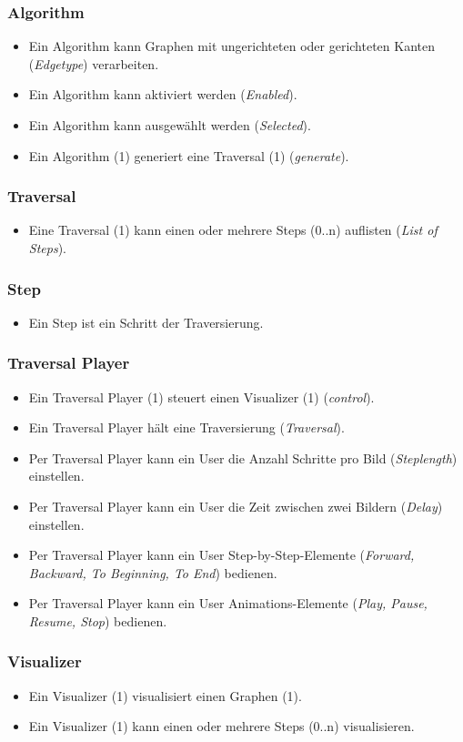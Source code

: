 \subsubsection{Algorithm}
\label{subsubsec:Algorithm}
\begin{itemize}
  \item Ein Algorithm kann Graphen mit ungerichteten oder gerichteten Kanten (\textit{Edgetype}) verarbeiten.
  \item Ein Algorithm kann aktiviert werden (\textit{Enabled}).
  \item Ein Algorithm kann ausgew\"ahlt werden (\textit{Selected}).
  \item Ein Algorithm (1) generiert eine Traversal (1) (\textit{generate}).
\end{itemize}
% 
\subsubsection{Traversal}
\label{subsubsec:Traversal}
\begin{itemize}
  \item Eine Traversal (1) kann einen oder mehrere Steps (0..n) auflisten (\textit{List of Steps}).
\end{itemize}

\subsubsection{Step}
\label{subsubsec:Step}
\begin{itemize}
  \item Ein Step ist ein Schritt der Traversierung.
\end{itemize}

\subsubsection{Traversal Player}
\label{subsubsec:Traversal Player}
\begin{itemize}
  \item Ein Traversal Player (1) steuert einen Visualizer (1) (\textit{control}).
  \item Ein Traversal Player h\"alt eine Traversierung (\textit{Traversal}).
  \item Per Traversal Player kann ein User die Anzahl Schritte pro Bild (\textit{Steplength}) einstellen.
  \item Per Traversal Player kann ein User die Zeit zwischen zwei Bildern (\textit{Delay}) einstellen.
  \item Per Traversal Player kann ein User Step-by-Step-Elemente (\textit{Forward, Backward, To Beginning, To End}) bedienen.
  \item Per Traversal Player kann ein User Animations-Elemente (\textit{Play, Pause, Resume, Stop}) bedienen.
\end{itemize}

\subsubsection{Visualizer}
\label{subsubsec:Visualizer}
\begin{itemize}
  \item Ein Visualizer (1) visualisiert einen Graphen (1).
  \item Ein Visualizer (1) kann einen oder mehrere Steps (0..n) visualisieren.
\end{itemize}
